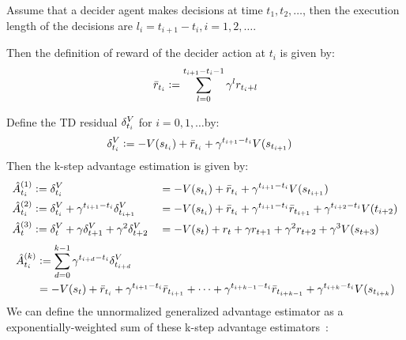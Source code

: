 Assume that a decider agent makes decisions at time $t_1,t_2,\dots$, then the execution length of the decisions are $l_i = t_{i+1} - t_i, i=1,2,\dots$.

Then the definition of reward of the decider action at $t_i$ is given by:
\begin{align}
\bar{r}_{t_i} \vcentcolon=
 \sum_{l=0}^{t_{i+1}-t_i-1}
  \gamma^l r_{t_i+l}
\end{align}

Define the TD residual $\delta^V_{t_i}$ for $i=0,1, \dots$by:
\begin{align}
\delta^V_{t_i} & \vcentcolon= -V(s_{t_i}) + \bar{r}_{t_i} + \gamma^{t_{i+1}-t_i} V(s_{t_{i+1}})
\end{align}
Then the k-step advantage estimation is given by:
\begin{alignat}{2}
\hat{A}_{t_i}^{(1)} 
& \vcentcolon=   \delta^V_{{t_i}} 
 &&=-V(s_{t_i}) + \bar{r}_{t_i} + \gamma^{t_{i+1}-t_i} V(s_{t_{i+1}})\\
\hat{A}_{t_i}^{(2)} 
&\vcentcolon= \delta^V_{t_i} + \gamma^{t_{i+1}-t_i} \delta^V_{t_{i+1}} 
&&= -V(s_{t_i}) +\bar{r}_{t_i} + \gamma^{t_{i+1}-t_i} \bar{r}_{t_{i+1}} + \gamma^{t_{i+2}-t_i} V(t_{i+2}) \\
\hat{A}_t^{(3)} 
&\vcentcolon= \delta^V_{t} + \gamma \delta^V_{t+1} + \gamma^2 \delta^V_{t+2} 
&&= -V(s_t) + r_t + \gamma r_{t+1} + \gamma^2 r_{t+2} + \gamma^3 V(s_{t+3}) \label{a3}
\end{alignat}
\begin{align}
\begin{split}
\hat{A}_{t_i}^{(k)} 
&\vcentcolon= \sum_{d=0}^{k-1} 
\gamma^{t_{i+d}-t_i} \delta^V_{t_{i+d}} \\
&= -V(s_t) 
+\bar{r}_{t_i} + \gamma^{t_{i+1}-t_i} \bar{r}_{t_{i+1}} 
+ \dots 
+ \gamma^{t_{i+k-1}-t_i} \bar{r}_{t_{i+k-1}} 
+ \gamma^{t_{i+k}-t_i} V(s_{t_{i+k}})
\end{split}
\end{align}
We can define the unnormalized generalized advantage estimator as a exponentially-weighted sum of these k-step advantage estimators~\cite{schulman2015high}:
